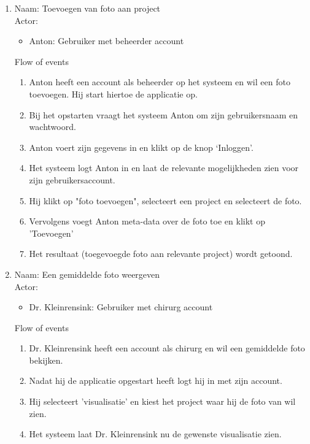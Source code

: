 \begin{enumerate}

\item   Naam: Toevoegen van foto aan project \\
	Actor:
	\begin{itemize}
		\item Anton: Gebruiker met beheerder account
	\end{itemize}
	Flow of events
	\begin{enumerate}
        \item Anton heeft een account als beheerder op het systeem en wil een foto toevoegen. Hij start hiertoe de applicatie op.
        \item Bij het opstarten vraagt het systeem Anton om zijn gebruikersnaam en wachtwoord.
        \item Anton voert zijn gegevens in en klikt op de knop `Inloggen'.
        \item Het systeem logt Anton in en laat de relevante mogelijkheden zien voor zijn gebruikersaccount.
				\item Hij klikt op "foto toevoegen", selecteert een project en selecteert de foto.
				\item Vervolgens voegt Anton meta-data over de foto toe en klikt op 'Toevoegen' 
				\item Het resultaat (toegevoegde foto aan relevante project) wordt getoond.
    \end{enumerate}

\item   Naam: Een gemiddelde foto weergeven \\
	Actor:
	\begin{itemize}
		\item Dr. Kleinrensink: Gebruiker met chirurg account
	\end{itemize}
	Flow of events
	\begin{enumerate}
	\item Dr. Kleinrensink heeft een account als chirurg en wil een gemiddelde foto bekijken.
	\item Nadat hij de applicatie opgestart heeft logt hij in met zijn account.
	\item Hij selecteert 'visualisatie' en kiest het project waar hij de foto van wil zien.
	\item Het systeem laat Dr. Kleinrensink nu de gewenste visualisatie zien.
	\end{enumerate}
\end{enumerate}

